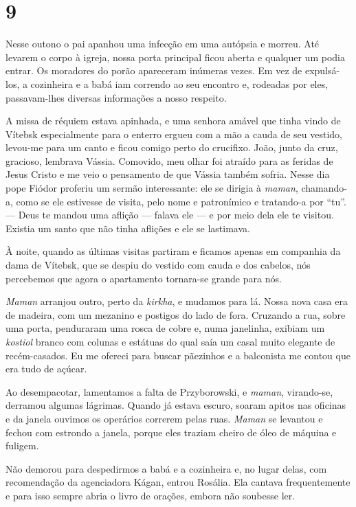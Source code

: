 \section{9}

Nesse outono o pai apanhou uma infecção em uma autópsia e morreu. Até
levarem o corpo à igreja, nossa porta principal ficou aberta e qualquer
um podia entrar. Os moradores do porão apareceram inúmeras vezes. Em vez
de expulsá-los, a cozinheira e a babá iam correndo ao seu encontro e,
rodeadas por eles, passavam-lhes diversas informações a nosso respeito.

A missa de réquiem estava apinhada, e uma senhora amável que tinha vindo
de Vítebsk especialmente para o enterro ergueu com a mão a cauda de seu
vestido, levou-me para um canto e ficou comigo perto do crucifixo. João,
junto da cruz, gracioso, lembrava Vássia. Comovido, meu olhar foi
atraído para as feridas de Jesus Cristo e me veio o pensamento de que
Vássia também sofria. Nesse dia pope Fiódor proferiu um sermão
interessante: ele se dirigia à \emph{maman}, chamando-a, como se ele
estivesse de visita, pelo nome e patronímico e tratando-a por ``tu''.
--- Deus te mandou uma aflição --- falava ele --- e por meio dela ele te
visitou. Existia um santo que não tinha aflições e ele se lastimava.

À noite, quando as últimas visitas partiram e ficamos apenas em
companhia da dama de Vítebsk, que se despiu do vestido com cauda e dos
cabelos, nós percebemos que agora o apartamento tornara-se grande para
nós.

\emph{Maman} arranjou outro, perto da \emph{kirkha}, e mudamos para lá.
Nossa nova casa era de madeira, com um mezanino e postigos do lado de
fora. Cruzando a rua, sobre uma porta, penduraram uma rosca de cobre e,
numa janelinha, exibiam um \emph{kostiol} branco com colunas e estátuas
do qual saía um casal muito elegante de recém-casados. Eu me ofereci
para buscar pãezinhos e a balconista me contou que era tudo de açúcar.

Ao desempacotar, lamentamos a falta de Przyborowski, e \emph{maman},
virando-se, derramou algumas lágrimas. Quando já estava escuro, soaram
apitos nas oficinas e da janela ouvimos os operários correrem pelas
ruas. \emph{Maman} se levantou e fechou com estrondo a janela, porque
eles traziam cheiro de óleo de máquina e fuligem.

Não demorou para despedirmos a babá e a cozinheira e, no lugar delas,
com recomendação da agenciadora Kágan, entrou Rosália. Ela cantava
frequentemente e para isso sempre abria o livro de orações, embora não
soubesse ler.

